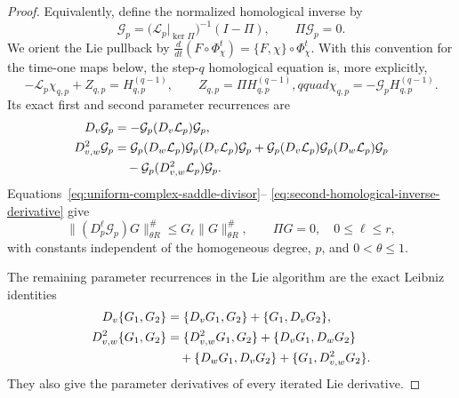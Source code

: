 \documentclass[11pt]{amsart}
\numberwithin{equation}{section}
\theoremstyle{definition}
\theoremstyle{remark}
\begin{document}
\begin{proof}
Equivalently, define the normalized homological inverse by
\begin{equation}\label{eq:normalized-homological-inverse}
 \mathcal G_p
 =\bigl(\mathcal L_p|_{\ker\Pi}\bigr)^{-1}(I-\Pi),
 \qquad \Pi\mathcal G_p=0.
\end{equation}
We orient the Lie pullback by
$\frac{d}{dt}(F\circ\Phi_\chi^t)=\{F,\chi\}\circ\Phi_\chi^t$.
With this convention for the time-one maps below,
the step-$q$ homological equation is, more explicitly,
\begin{equation}\label{eq:parametric-homological-equation}
 -\mathcal L_p\chi_{q,p}+Z_{q,p}=H_{q,p}^{(q-1)},
 \qquad
 Z_{q,p}=\Pi H_{q,p}^{(q-1)},qquad
 \chi_{q,p}=-\mathcal G_pH_{q,p}^{(q-1)}.
\end{equation}
Its exact first and second parameter recurrences are
\begin{align}
 D_v\mathcal G_p
 &=-\mathcal G_p(D_v\mathcal L_p)\mathcal G_p,
 \label{eq:first-homological-inverse-derivative}\\
 D^2_{v,w}\mathcal G_p
 &=\mathcal G_p(D_w\mathcal L_p)\mathcal G_p
       (D_v\mathcal L_p)\mathcal G_p
   +\mathcal G_p(D_v\mathcal L_p)\mathcal G_p
       (D_w\mathcal L_p)\mathcal G_p \notag\\
 &\quad-\mathcal G_p(D^2_{v,w}\mathcal L_p)\mathcal G_p.
 \label{eq:second-homological-inverse-derivative}
\end{align}
Equations~\eqref{eq:uniform-complex-saddle-divisor}--
\eqref{eq:second-homological-inverse-derivative} give
\begin{equation}\label{eq:parametric-homological-bound}
 \|(D_p^\ell\mathcal G_p)G\|_{\theta R}^{\#}
 \le G_\ell\|G\|_{\theta R}^{\#},
 \qquad \Pi G=0,\quad 0\le\ell\le r,
\end{equation}
with constants independent of the homogeneous degree, $p$, and
$0<\theta\le1$.

The remaining parameter recurrences in the Lie algorithm are the exact
Leibniz identities
\begin{align}
 D_v\{G_1,G_2\}
 &=\{D_vG_1,G_2\}+\{G_1,D_vG_2\},
 \label{eq:first-bracket-parameter-recurrence}\\
 D^2_{v,w}\{G_1,G_2\}
 &=\{D^2_{v,w}G_1,G_2\}
   +\{D_vG_1,D_wG_2\}\notag\\
 &\quad
   +\{D_wG_1,D_vG_2\}
   +\{G_1,D^2_{v,w}G_2\}.
 \label{eq:second-bracket-parameter-recurrence}
\end{align}
They also give the parameter derivatives of every iterated Lie derivative.


\end{proof}
\end{document}
